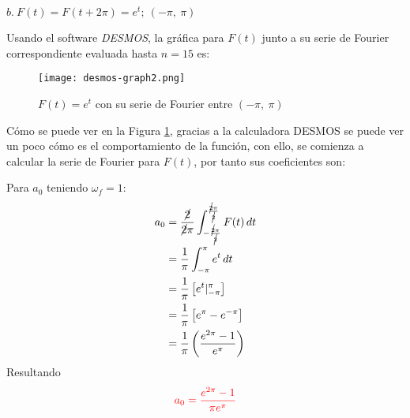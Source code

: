 \begin{multicols}{2}
$b.~F(t) = F(t + 2\pi) = e^{t};~(-\pi,~\pi)$

Usando el software \textit{DESMOS}, la gráfica para $F(t)$ junto a su serie de Fourier correspondiente evaluada hasta $n=15$ es:

\begin{figure}[H]
\begin{center}
    \texttt{[image: desmos-graph2.png]}
    \caption{$F(t) = e^{t}$ con su serie de Fourier entre $(-\pi,~\pi)$}
    \label{figdes:2} 
\end{center}
\end{figure} 

Cómo se puede ver en la Figura \ref{figdes:2}, gracias a la calculadora DESMOS se puede ver un poco cómo es el comportamiento de la función, con ello, se comienza a calcular la serie de Fourier para $F(t)$, por tanto sus coeficientes son:

Para $a_0$ teniendo $\omega_f = 1$:
\begin{align*}
    a_0 &= \frac{\cancel{2}}{\cancel{2}\pi} \int_{-\frac{\cancel{2}\pi}{\cancel{2}}}^{\frac{\cancel{2}\pi}{\cancel{2}}} F(t) \,dt\\
    &= \frac{1}{\pi} \int_{-\pi}^{\pi} e^{t} \,dt\\
    &= \frac{1}{\pi} \left[e^{t} |_{-\pi}^{\pi}\right]\\
    &= \frac{1}{\pi} \left[e^{\pi} - e^{-\pi}\right]\\
    &= \frac{1}{\pi} \left(\frac{e^{2\pi}-1}{e^{\pi}}\right)
\end{align*}
Resultando
\begin{equation}
    \textcolor{rojo}{a_0 = \frac{e^{2\pi} - 1}{\pi e^{\pi}}}
    \label{res:22}
\end{equation}


\end{multicols}

